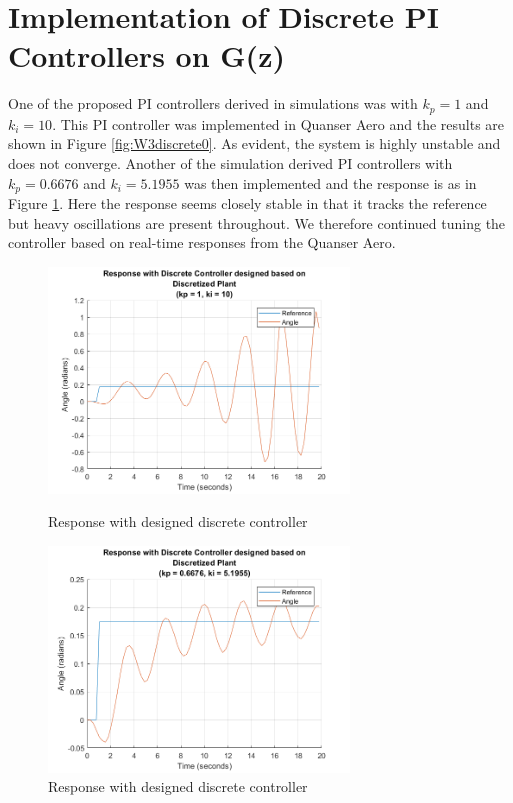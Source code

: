 \documentclass[11pt]{article}
\begin{document}
\section{Implementation of Discrete PI Controllers on G(z)}
One of the proposed PI controllers derived in simulations was with $k_{p} = 1$ and $k_i = 10$. This PI controller was implemented in Quanser Aero and the results are shown in Figure \ref{fig:W3discrete0}. As evident, the system is highly unstable and does not converge. Another of the simulation derived PI controllers with $k_{p} = 0.6676$ and $k_i = 5.1955$ was then implemented and the response is as in Figure \ref{fig:W3discrete1}. Here the response seems closely stable in that it tracks the reference but heavy oscillations are present throughout. We therefore continued tuning the controller based on real-time responses from the Quanser Aero.\\

\begin{figure}[H]
\begin{minipage}{.5\textwidth}
    \centering
    \includegraphics[width=8cm]{plots/Discrete_1_10.png}
    \caption{\small{Response with designed discrete controller}}
    \label{fig:W3discrete0}
\end{minipage}%
\begin{minipage}{.5\textwidth}
    \centering
    \includegraphics[width=8cm]{plots/Discrete_0_6676_5_1955.png}
    \caption{\small{Response with designed discrete controller}}
    \label{fig:W3discrete1}
\end{minipage}
\end{figure}
\end{document}
